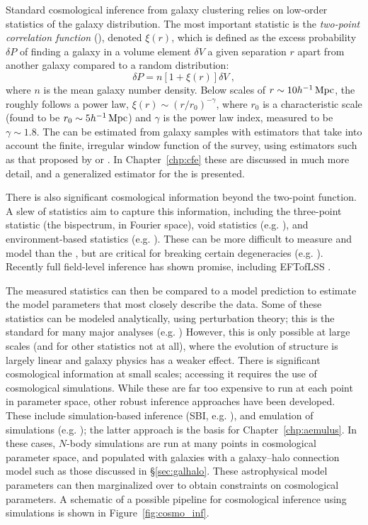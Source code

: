 Standard cosmological inference from galaxy clustering relies on low-order statistics of the galaxy distribution.
The most important statistic is the \emph{two-point correlation function} (\cf), denoted $\xi(r)$, which is defined as the excess probability $\delta P$ of finding a galaxy in a volume element $\delta V$ a given separation $r$ apart from another galaxy compared to a random distribution:
\begin{equation}
    \delta P = n[1+\xi(r)]\delta V ~,
\end{equation}
where $n$ is the mean galaxy number density.
Below scales of $r \sim 10 h^{-1}\,\mathrm{Mpc}$, the \cf roughly follows a power law, $\xi(r) \sim (r/r_0)^{-\gamma}$, where $r_0$ is a characteristic scale (found to be $r_0 \sim 5 h^{-1}\,\mathrm{Mpc}$) and $\gamma$ is the power law index, measured to be $\gamma \sim 1.8$.
The \cf can be estimated from galaxy samples with estimators that take into account the finite, irregular window function of the survey, using estimators such as that proposed by \cite{DavisPeebles1983} or \cite{LandySzalay1993}.
In Chapter~\ref{chp:cfe} these are discussed in much more detail, and a generalized estimator for the \cf is presented.

There is also significant cosmological information beyond the two-point function.
A slew of statistics aim to capture this information, including the three-point statistic (the bispectrum, in Fourier space), void statistics (e.g. \citealt{sheth_hierarchy_2004}), and environment-based statistics (e.g. \citealt{Sheth2004,tinker_void_2007}).
These can be more difficult to measure and model than the \cf, but are critical for breaking certain degeneracies (e.g. \citep{WhitePadmanabhan2009}).
Recently full field-level inference has shown promise, including EFTofLSS \citep{baumann_cosmological_2012}.

The measured statistics can then be compared to a model prediction to estimate the model parameters that most closely describe the data.
Some of these statistics can be modeled analytically, using perturbation theory; this is the standard for many major analyses (e.g. \citealt{tegmark_cosmological_2006}) 
However, this is only possible at large scales (and for other statistics not at all), where the evolution of structure is largely linear and galaxy physics has a weaker effect.
There is significant cosmological information at small scales; accessing it requires the use of cosmological simulations.
While these are far too expensive to run at each point in parameter space, other robust inference approaches have been developed. 
These include simulation-based inference (SBI, e.g. \citealt{hahn_rm_2022}), and emulation of simulations (e.g. \citealt{Heitmann2009, Lawrence2017, Angulo2021}); the latter approach is the basis for Chapter~\ref{chp:aemulus}.
In these cases, $N$-body simulations are run at many points in cosmological parameter space, and populated with galaxies with a galaxy--halo connection model such as those discussed in \S\ref{sec:galhalo}.
These astrophysical model parameters can then marginalized over to obtain constraints on cosmological parameters.
A schematic of a possible pipeline for cosmological inference using simulations is shown in Figure~\ref{fig:cosmo_inf}.

